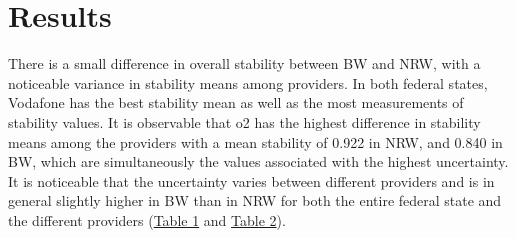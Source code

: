 \documentclass{article}
\theoremstyle{plain}
\theoremstyle{definition}
\theoremstyle{remark}
\begin{document}
\section{Results}\label{sec:results}
There is a small difference in overall stability between \gls*{BW} and \gls*{NRW}, with a noticeable variance in stability means among providers. In both federal states, Vodafone has the best stability mean as well as the most measurements of stability values. It is observable that o2 has the highest difference in stability means among the providers with a mean stability of 0.922 in \gls*{NRW}, and 0.840 in \gls*{BW}, which are simultaneously the values associated with the highest uncertainty. It is noticeable that the uncertainty varies between different providers and is in general slightly higher in \gls*{BW} than in \gls*{NRW} for both the entire federal state and the different providers (\hyperref[tab:stability_metrics_bw]{Table 1} and \hyperref[tab:stability_metrics_nrw]{Table 2}). 
\end{document}
